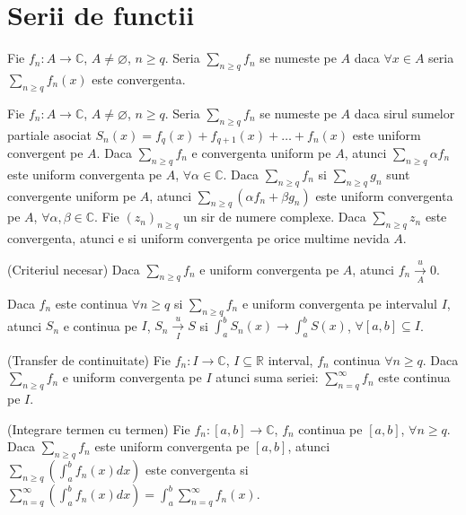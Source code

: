 \documentclass{article}
\begin{document}
\section{Serii de functii}
\begin{enumerate}

   Fie $f_n : A \to \mathbb{C}$, $A \neq \varnothing$, $n \geq q$. Seria $\sum_{n \geq q} f_n$ se numeste  pe $A$ daca $\forall x \in A$ seria $\sum_{n \geq q} f_n(x)$ este convergenta.

   Fie $f_n : A \to \mathbb{C}$, $A \neq \varnothing$, $n \geq q$. Seria $\sum_{n \geq q} f_n$ se numeste  pe $A$ daca sirul sumelor partiale asociat $S_n(x) = f_q(x) + f_{q+1}(x) + \dots + f_{n}(x)$ este uniform convergent pe $A$.
  \proprietate Daca $\sum_{n \geq q} f_n$ e convergenta uniform pe $A$, atunci $\sum_{n \geq q} \alpha f_n $ este uniform convergenta pe $A$, $\forall \alpha \in \mathbb{C}$.
  \proprietate Daca $\sum_{n \geq q} f_n$ si $\sum_{n \geq q} g_n$ sunt convergente uniform pe $A$, atunci $\sum_{n \geq q} (\alpha f_n + \beta g_n)$ este uniform convergenta pe $A$, $\forall \alpha, \beta \in \mathbb{C}$.
  \proprietate Fie $(z_n)_{n \geq q}$ un sir de numere complexe. Daca $\sum_{n \geq q} z_n$ este convergenta, atunci e si uniform convergenta pe orice multime nevida $A$.

  \propozitie (Criteriul necesar) Daca $\sum_{n \geq q} f_n$ e uniform convergenta pe $A$, atunci $f_n \xrightarrow[A]{u} 0$.
  
  \propozitie Daca $f_n$ este continua $\forall n \geq q$ si $\sum_{n \geq q} f_n$ e uniform convergenta pe intervalul $I$, atunci $S_n$ e continua pe $I$, $S_n \xrightarrow[I]{u} S$ si $\int_{a}^{b} S_n(x) \to \int_{a}^{b} S(x)$, $\forall [a, b] \subseteq I$.

\begin{tcolorbox}
  \teorema (Transfer de continuitate) Fie $f_n : I \to \mathbb{C}$, $I \subseteq \mathbb{R}$ interval, $f_n$ continua $\forall n \geq q$. Daca $\sum_{n \geq q} f_n$ e uniform convergenta pe $I$ atunci suma seriei: $\sum_{n = q}^{\infty} f_n$ este continua pe $I$.
\end{tcolorbox}

\begin{tcolorbox}
  \teorema (Integrare termen cu termen) Fie $f_n : [a, b] \to \mathbb{C}$, $f_n$ continua pe $[a, b]$, $\forall n \geq q$. Daca $\sum_{n \geq q} f_n$ este uniform convergenta pe $[a, b]$, atunci $\sum_{n \geq q} \left(\int_a^b f_n(x) dx \right)$ este convergenta si $\sum_{n = q}^{\infty} \left(\int_a^b f_n(x) dx \right) = \int_a^b \sum_{n = q}^{\infty} f_n(x)$.
\end{tcolorbox}


\end{enumerate}
\end{document}
